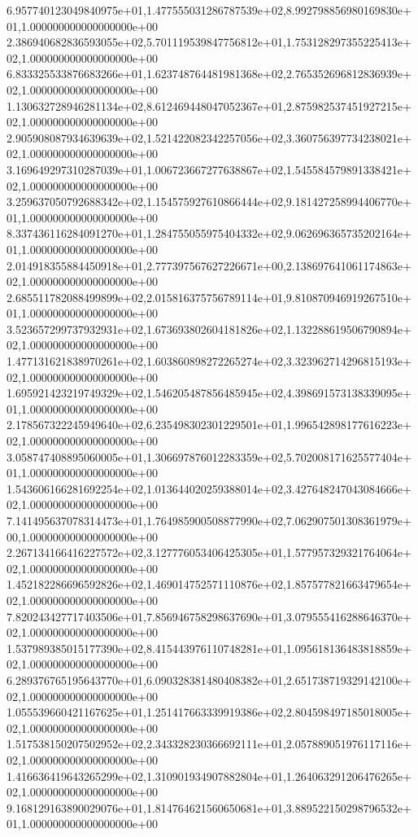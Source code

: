 6.957740123049840975e+01,1.477555031286787539e+02,8.992798856980169830e+01,1.000000000000000000e+00
2.386940682836593055e+02,5.701119539847756812e+01,1.753128297355225413e+02,1.000000000000000000e+00
6.833325533876683266e+01,1.623748764481981368e+02,2.765352696812836939e+02,1.000000000000000000e+00
1.130632728946281134e+02,8.612469448047052367e+01,2.875982537451927215e+02,1.000000000000000000e+00
2.905908087934639639e+02,1.521422082342257056e+02,3.360756397734238021e+02,1.000000000000000000e+00
3.169649297310287039e+01,1.006723667277638867e+02,1.545584579891338421e+02,1.000000000000000000e+00
3.259637050792688342e+02,1.154575927610866444e+02,9.181427258994406770e+01,1.000000000000000000e+00
8.337436116284091270e+01,1.284755055975404332e+02,9.062696365735202164e+01,1.000000000000000000e+00
2.014918355884450918e+01,2.777397567627226671e+00,2.138697641061174863e+02,1.000000000000000000e+00
2.685511782088499899e+02,2.015816375756789114e+01,9.810870946919267510e+01,1.000000000000000000e+00
3.523657299737932931e+02,1.673693802604181826e+02,1.132288619506790894e+02,1.000000000000000000e+00
1.477131621838970261e+02,1.603860898272265274e+02,3.323962714296815193e+02,1.000000000000000000e+00
1.695921423219749329e+02,1.546205487856485945e+02,4.398691573138339095e+01,1.000000000000000000e+00
2.178567322245949640e+02,6.235498302301229501e+01,1.996542898177616223e+02,1.000000000000000000e+00
3.058747408895060005e+01,1.306697876012283359e+02,5.702008171625577404e+01,1.000000000000000000e+00
1.543606166281692254e+02,1.013644020259388014e+02,3.427648247043084666e+02,1.000000000000000000e+00
7.141495637078314473e+01,1.764985900508877990e+02,7.062907501308361979e+00,1.000000000000000000e+00
2.267134166416227572e+02,3.127776053406425305e+01,1.577957329321764064e+02,1.000000000000000000e+00
1.452182286696592826e+02,1.469014752571110876e+02,1.857577821663479654e+02,1.000000000000000000e+00
7.820243427717403506e+01,7.856946758298637690e+01,3.079555416288646370e+02,1.000000000000000000e+00
1.537989385015177390e+02,8.415443976110748281e+01,1.095618136483818859e+02,1.000000000000000000e+00
6.289376765195643770e+01,6.090328381480408382e+01,2.651738719329142100e+02,1.000000000000000000e+00
1.055539660421167625e+01,1.251417663339919386e+02,2.804598497185018005e+02,1.000000000000000000e+00
1.517538150207502952e+02,2.343328230366692111e+01,2.057889051976117116e+02,1.000000000000000000e+00
1.416636419643265299e+02,1.310901934907882804e+01,1.264063291206476265e+02,1.000000000000000000e+00
9.168129163890029076e+01,1.814764621560650681e+01,3.889522150298796532e+01,1.000000000000000000e+00
